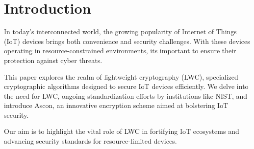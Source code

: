 \section{Introduction}
In today's interconnected world, the growing popularity of Internet of Things (IoT) devices brings both convenience and security challenges. With these devices operating in resource-constrained environments, its important to ensure their protection against cyber threats.

This paper explores the realm of lightweight cryptography (LWC), specialized cryptographic algorithms designed to secure IoT devices efficiently. We delve into the need for LWC, ongoing standardization efforts by institutions like NIST, and introduce Ascon, an innovative encryption scheme aimed at bolstering IoT security.

Our aim is to highlight the vital role of LWC in fortifying IoT ecosystems and advancing security standards for resource-limited devices.